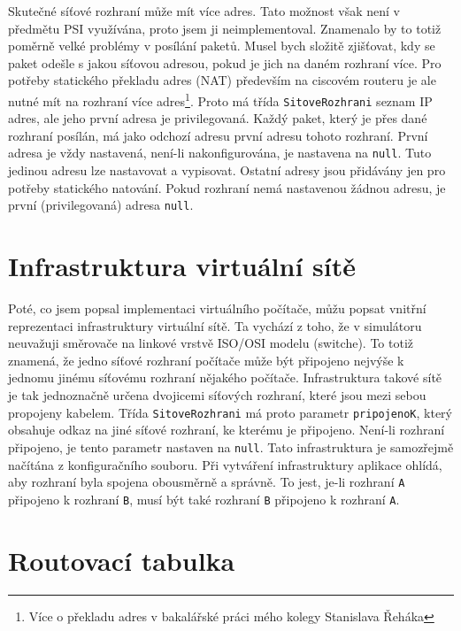 Skutečné síťové rozhraní může mít více adres. Tato možnost však není v předmětu PSI využívána, proto jsem ji neimplementoval. Znamenalo by to totiž poměrně velké problémy v posílání paketů. Musel bych složitě zjišťovat, kdy se paket odešle s jakou síťovou adresou, pokud je jich na daném rozhraní více. Pro potřeby statického překladu adres (NAT) především na ciscovém routeru je ale nutné mít na rozhraní více adres\footnote{Více o překladu adres v bakalářské práci mého kolegy Stanislava Řeháka}. Proto má třída \verb|SitoveRozhrani| seznam IP adres, ale jeho první adresa je privilegovaná. Každý paket, který je přes dané rozhraní posílán, má jako odchozí adresu první adresu tohoto rozhraní. První adresa je vždy nastavená, není-li nakonfigurována, je nastavena na \verb|null|. Tuto jedinou adresu lze nastavovat a vypisovat. Ostatní adresy jsou přidávány jen pro potřeby statického natování. Pokud rozhraní nemá nastavenou žádnou adresu, je první (privilegovaná) adresa \verb|null|.




\section{Infrastruktura virtuální sítě}\label{infrastruktura_site}

Poté, co jsem popsal implementaci virtuálního počítače, můžu popsat vnitřní reprezentaci infrastruktury virtuální sítě. Ta vychází z toho, že v simulátoru neuvažuji směrovače na linkové vrstvě ISO/OSI modelu (switche). To totiž znamená, že jedno síťové rozhraní počítače může být připojeno nejvýše k jednomu jinému síťovému rozhraní nějakého počítače. Infrastruktura takové sítě je tak jednoznačně určena dvojicemi síťových rozhraní, které jsou mezi sebou propojeny kabelem. Třída \verb|SitoveRozhrani| má proto parametr \verb|pripojenoK|, který obsahuje odkaz na jiné síťové rozhraní, ke kterému je připojeno. Není-li rozhraní připojeno, je tento parametr nastaven na \verb|null|. Tato infrastruktura je samozřejmě načítána z konfiguračního souboru. Při vytváření infrastruktury aplikace ohlídá, aby rozhraní byla spojena obousměrně a správně. To jest, je-li rozhraní \verb|A| připojeno k rozhraní \verb|B|, musí být také rozhraní \verb|B| připojeno k rozhraní \verb|A|.




\section{Routovací tabulka}

